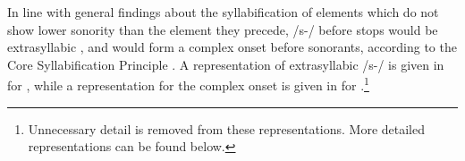 In line with general findings about the syllabification of elements which do not show lower sonority than the element they precede, /s-/ before stops would be extrasyllabic \citep{HalleEtAl1980,Wiese1988}, and would form a complex onset before sonorants, according to the Core Syllabification Principle \citep[299]{Clements1990sonority}. %
A representation of extrasyllabic /s-/ is given in  for , while a representation for the complex onset is given in  for .\footnote{Unnecessary detail is removed from these representations. More detailed representations can be found below.}


